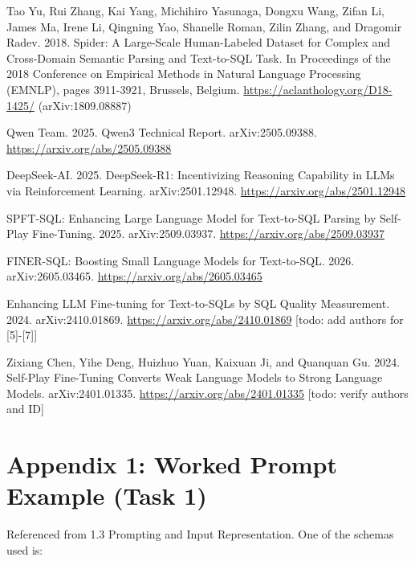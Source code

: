 \documentclass[11pt]{article}
\begin{document}
\begin{enumerate}[leftmargin=2.2em, label={[\arabic*]}]
\item Tao Yu, Rui Zhang, Kai Yang, Michihiro Yasunaga, Dongxu Wang, Zifan Li, James Ma, Irene Li, Qingning Yao, Shanelle Roman, Zilin Zhang, and Dragomir Radev. 2018. Spider: A Large-Scale Human-Labeled Dataset for Complex and Cross-Domain Semantic Parsing and Text-to-SQL Task. In Proceedings of the 2018 Conference on Empirical Methods in Natural Language Processing (EMNLP), pages 3911-3921, Brussels, Belgium. \url{https://aclanthology.org/D18-1425/} (arXiv:1809.08887)
\setcounter{enumi}{1}
\item Qwen Team. 2025. Qwen3 Technical Report. arXiv:2505.09388. \url{https://arxiv.org/abs/2505.09388}
\setcounter{enumi}{3}
\item DeepSeek-AI. 2025. DeepSeek-R1: Incentivizing Reasoning Capability in LLMs via Reinforcement Learning. arXiv:2501.12948. \url{https://arxiv.org/abs/2501.12948}
\item SPFT-SQL: Enhancing Large Language Model for Text-to-SQL Parsing by Self-Play Fine-Tuning. 2025. arXiv:2509.03937. \url{https://arxiv.org/abs/2509.03937}
\item FINER-SQL: Boosting Small Language Models for Text-to-SQL. 2026. arXiv:2605.03465. \url{https://arxiv.org/abs/2605.03465}
\item Enhancing LLM Fine-tuning for Text-to-SQLs by SQL Quality Measurement. 2024. arXiv:2410.01869. \url{https://arxiv.org/abs/2410.01869} [todo: add authors for [5]-[7]]
\item Zixiang Chen, Yihe Deng, Huizhuo Yuan, Kaixuan Ji, and Quanquan Gu. 2024. Self-Play Fine-Tuning Converts Weak Language Models to Strong Language Models. arXiv:2401.01335. \url{https://arxiv.org/abs/2401.01335} [todo: verify authors and ID]
\end{enumerate}

\section*{Appendix 1: Worked Prompt Example (Task 1)}
\label{sec:appendix1}

Referenced from 1.3 Prompting and Input Representation. One of the schemas used is:
\end{document}
